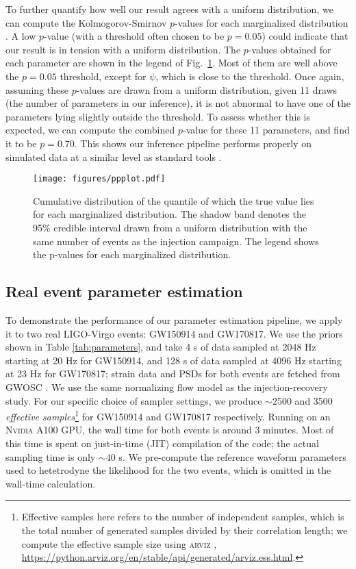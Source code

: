 \documentclass[twocolumn]{aastex631}
\begin{document}
To further quantify how well our result agrees with a uniform distribution, we
can compute the Kolmogorov-Smirnov $p$-values for each marginalized
distribution \citep{}.  A low $p$-value (with a threshold often
chosen to be $p = 0.05$) could indicate that our result is in tension with a uniform
distribution. The $p$-values obtained for each parameter are shown in the
legend of Fig.~\ref{fig:ppplot}. Most of them are well above the $p = 0.05$
threshold, except for $\psi$, which is close to the threshold. Once
again, assuming these $p$-values are drawn from a uniform distribution, given
11 draws (the number of parameters in our inference), it is not abnormal to
have one of the parameters lying slightly outside the threshold. To assess
whether this is expected, we can compute the combined $p$-value for these 11
parameters, and find it to be $p = 0.70$.  This shows our inference pipeline
performs properly on simulated data at a similar level as standard tools
\citep{Veitch:2014wba,Romero-Shaw:2020owr}.

\begin{figure}
    \texttt{[image: figures/ppplot.pdf]}
    \caption{Cumulative distribution of the quantile of which the true value
    lies for each marginalized distribution. The shadow band denotes the 95\%
    credible interval drawn from a uniform distribution with the same number of
    events as the injection campaign. The legend shows the p-values for each
    marginalized distribution.}
    \label{fig:ppplot}
\end{figure}

\subsection{Real event parameter estimation}

To demonstrate the performance of our parameter estimation pipeline, we apply
it to two real LIGO-Virgo events: GW150914 and GW170817. We use the priors
shown in Table \ref{tab:parameters}, and take 4 s of data sampled at 2048 Hz
starting at 20 Hz for GW150914, and 128 s of data sampled at 4096 Hz starting
at 23 Hz for GW170817; strain data and PSDs for both events are fetched from
GWOSC \citep{GWOSC}. We use the same normalizing flow model as the
injection-recovery study. For our specific choice of sampler settings, we
produce ${\sim}$2500 and 3500 \emph{effective samples}\footnote{Effective
samples here refers to the number of independent samples, which is the total
number of generated samples divided by their correlation length; we compute the
effective sample size using \textsc{arviz}
\citep{arviz_2019}, \url{https://python.arviz.org/en/stable/api/generated/arviz.ess.html}.
} for GW150914 and GW170817 respectively. Running on an \textsc{Nvidia} A100
GPU, the wall time for both events is around 3 minutes. Most of this time is
spent on just-in-time (JIT) compilation of the code; the actual sampling time
is only ${\sim}40$ s. We pre-compute the reference waveform parameters used to
hetetrodyne the likelihood for the two events, which is omitted in the
wall-time calculation.
\end{document}
